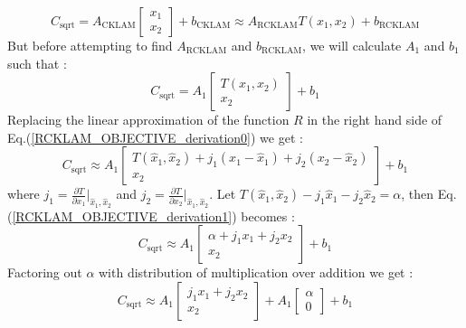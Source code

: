 \begin{equation}
  C_\mathrm{sqrt} = A_\mathrm{CKLAM}\begin{bmatrix} x_1 \\ x_2 \end{bmatrix} + b_\mathrm{CKLAM}\approx A_\mathrm{RCKLAM}T(x_1, x_2) + b_\mathrm{RCKLAM}
	\label{RCKLAM_OBJECTIVE}
\end{equation}
But before attempting to find $A_\mathrm{RCKLAM}$ and $b_\mathrm{RCKLAM}$, we will calculate $A_1$ and $b_1$ such that :
\begin{equation}
  C_\mathrm{sqrt} = A_1\begin{bmatrix} T(x_1, x_2) \\ x_2 \end{bmatrix} + b_1
	\label{RCKLAM_OBJECTIVE_derivation0}
\end{equation}
Replacing the linear approximation of the function $R$ in the right hand side of Eq.(\ref{RCKLAM_OBJECTIVE_derivation0}) we get : 
\begin{equation}
  C_\mathrm{sqrt}\approx A_1\begin{bmatrix} T(\hat x_1, \hat x_2) + j_1(x_1 - \hat x_1) + j_2(x_2 - \hat x_2) \\ x_2 \end{bmatrix} + b_1
  \label{RCKLAM_OBJECTIVE_derivation1}
\end{equation}
where $j_1 = \frac{\partial T}{\partial x_1}\biggr\rvert_{\hat x_1, \hat x_2}$ and $j_2 = \frac{\partial T}{\partial x_2}\biggr\rvert_{\hat x_1, \hat x_2}$. Let $T(\hat x_1, \hat x_2) - j_1\hat x_1 - j_2\hat x_2 = \alpha$, then Eq.(\ref{RCKLAM_OBJECTIVE_derivation1}) becomes :
\begin{equation}
  C_\mathrm{sqrt}\approx A_1\begin{bmatrix} \alpha + j_1x_1 + j_2x_2 \\ x_2 \end{bmatrix} + b_1
  \label{RCKLAM_OBJECTIVE_derivation2}
\end{equation}
Factoring out $\alpha$ with distribution of multiplication over addition we get :
\begin{equation}
  C_\mathrm{sqrt}\approx A_1\begin{bmatrix} j_1x_1 + j_2x_2 \\ x_2 \end{bmatrix} + A_1\begin{bmatrix}\alpha \\ 0\end{bmatrix}+b_1
  \label{RCKLAM_OBJECTIVE_derivation3}
\end{equation}
